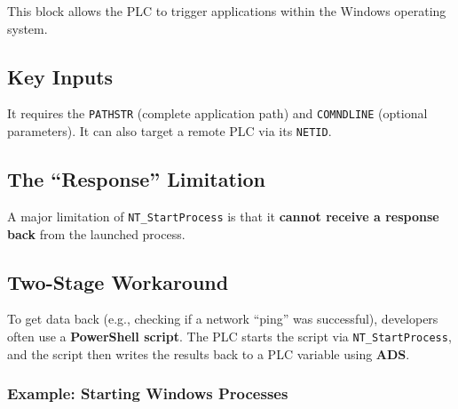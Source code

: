 \documentclass[11pt,a4paper]{article}
\begin{document}
This block allows the PLC to trigger applications within the Windows operating system.

\subsection{Key Inputs}

It requires the \texttt{PATHSTR} (complete application path) and \texttt{COMNDLINE} (optional parameters). It can also target a remote PLC via its \texttt{NETID}.

\subsection{The ``Response'' Limitation}

A major limitation of \texttt{NT\_StartProcess} is that it \textbf{cannot receive a response back} from the launched process.

\subsection{Two-Stage Workaround}

To get data back (e.g., checking if a network ``ping'' was successful), developers often use a \textbf{PowerShell script}. The PLC starts the script via \texttt{NT\_StartProcess}, and the script then writes the results back to a PLC variable using \textbf{ADS}.

\subsubsection*{Example: Starting Windows Processes}
\end{document}
